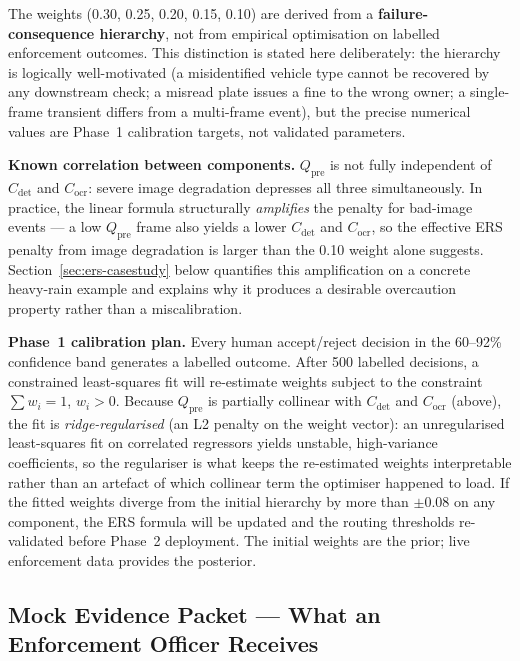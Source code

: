 \documentclass[11pt,a4paper]{article}
\begin{document}
\begin{callout}
The weights (0.30, 0.25, 0.20, 0.15, 0.10) are derived from a \textbf{failure-consequence hierarchy}, not from empirical optimisation on labelled enforcement outcomes. This distinction is stated here deliberately: the hierarchy is logically well-motivated (a misidentified vehicle type cannot be recovered by any downstream check; a misread plate issues a fine to the wrong owner; a single-frame transient differs from a multi-frame event), but the precise numerical values are Phase~1 calibration targets, not validated parameters.

\textbf{Known correlation between components.} $Q_{\text{pre}}$ is not fully independent of $C_{\text{det}}$ and $C_{\text{ocr}}$: severe image degradation depresses all three simultaneously. In practice, the linear formula structurally \emph{amplifies} the penalty for bad-image events --- a low $Q_{\text{pre}}$ frame also yields a lower $C_{\text{det}}$ and $C_{\text{ocr}}$, so the effective ERS penalty from image degradation is larger than the 0.10 weight alone suggests. Section~\ref{sec:ers-casestudy} below quantifies this amplification on a concrete heavy-rain example and explains why it produces a desirable overcaution property rather than a miscalibration.

\textbf{Phase~1 calibration plan.} Every human accept/reject decision in the 60--92\% confidence band generates a labelled outcome. After 500 labelled decisions, a constrained least-squares fit will re-estimate weights subject to the constraint $\sum w_i = 1$, $w_i > 0$. Because $Q_{\text{pre}}$ is partially collinear with $C_{\text{det}}$ and $C_{\text{ocr}}$ (above), the fit is \emph{ridge-regularised} (an L2 penalty on the weight vector): an unregularised least-squares fit on correlated regressors yields unstable, high-variance coefficients, so the regulariser is what keeps the re-estimated weights interpretable rather than an artefact of which collinear term the optimiser happened to load. If the fitted weights diverge from the initial hierarchy by more than $\pm 0.08$ on any component, the ERS formula will be updated and the routing thresholds re-validated before Phase~2 deployment. The initial weights are the prior; live enforcement data provides the posterior.
\end{callout}

\subsection*{Mock Evidence Packet — What an Enforcement Officer Receives}
\end{document}
